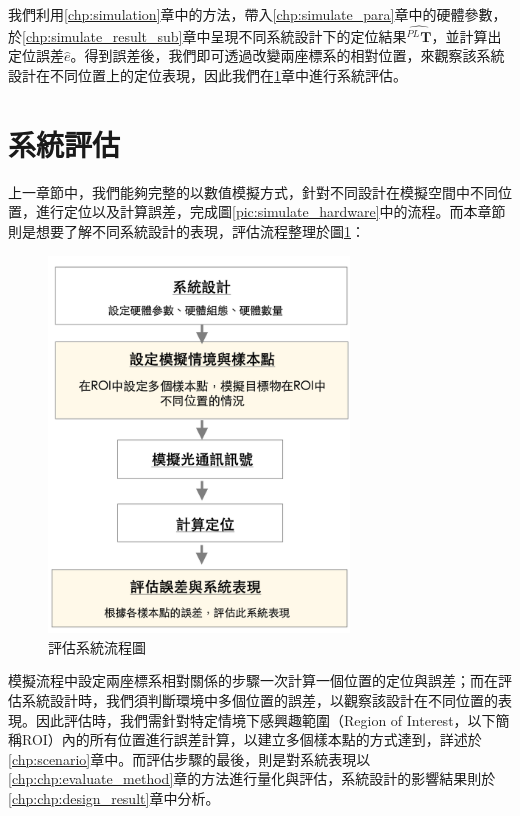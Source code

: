 我們利用\ref{chp:simulation}章中的方法，帶入\ref{chp:simulate_para}章中的硬體參數，於\ref{chp:simulate_result_sub}章中呈現不同系統設計下的定位結果$\hat{^{PL}\boldsymbol{T}}$，並計算出定位誤差$\hat{e}$。得到誤差後，我們即可透過改變兩座標系的相對位置，來觀察該系統設計在不同位置上的定位表現，因此我們在\ref{chp:system_evaluate}章中進行系統評估。






\section{系統評估}
\label{chp:system_evaluate}

上一章節中，我們能夠完整的以數值模擬方式，針對不同設計在模擬空間中不同位置，進行定位以及計算誤差，完成圖\ref{pic:simulate_hardware}中的流程。而本章節則是想要了解不同系統設計的表現，評估流程整理於圖\ref{pic:evaluate_flow}：


\begin{figure}[ht]
    \centering
    \includegraphics[width=8cm]{ch4pic/evaluate_flow.png}
    \caption{評估系統流程圖}
    \label{pic:evaluate_flow}
\end{figure}

模擬流程中設定兩座標系相對關係的步驟一次計算一個位置的定位與誤差；而在評估系統設計時，我們須判斷環境中多個位置的誤差，以觀察該設計在不同位置的表現。因此評估時，我們需針對特定情境下感興趣範圍（Region of Interest，以下簡稱ROI）內的所有位置進行誤差計算，以建立多個樣本點的方式達到，詳述於\ref{chp:scenario}章中。而評估步驟的最後，則是對系統表現以\ref{chp:chp:evaluate_method}章的方法進行量化與評估，系統設計的影響結果則於\ref{chp:chp:design_result}章中分析。






